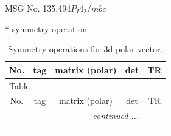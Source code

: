 \documentclass[fleqn,8pt]{jsarticle}
\begin{document}
\setcounter{MaxMatrixCols}{32}

\renewcommand{\tablename}{Table~}
\renewcommand{\figurename}{Figure~}
\begin{center}
\LARGE
MSG No. 135.494\quad$P_{I}4_{2}/mbc$
\end{center}
* symmetry operation
\renewcommand{\arraystretch}{1.3}
\begin{longtable}{ccccc}
\caption{Symmetry operations for 3d polar vector.}
 \\
 \hline \hline
No. & tag & matrix (polar) & det & TR \\ \hline \endfirsthead

\multicolumn{4}{l}{\tablename\ \thetable{}} \\
 \hline \hline
No. & tag & matrix (polar) & det & TR \\ \hline \endhead

 \hline \hline
\multicolumn{4}{r}{\footnotesize\it continued ...} \\ \endfoot

 \hline \hline
\multicolumn{4}{r}{} \\ \endlastfoot


\end{longtable}
\end{document}
